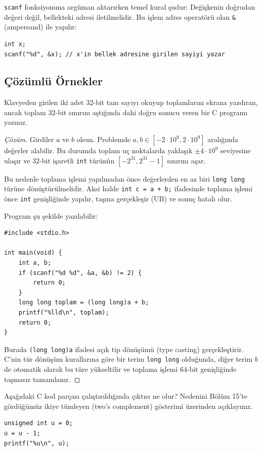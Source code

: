 \texttt{scanf} fonksiyonuna argüman aktarırken temel kural şudur: Değişkenin doğrudan değeri değil, bellekteki adresi iletilmelidir. Bu işlem adres operatörü olan \texttt{\&} (ampersand) ile yapılır:
\begin{lstlisting}[language=CTemel]
int x;
scanf("%d", &x); // x'in bellek adresine girilen sayiyi yazar
\end{lstlisting}

\subsection{Çözümlü Örnekler}

\begin{example}
Klavyeden girilen iki adet $32$-bit tam sayıyı okuyup toplamlarını ekrana yazdıran, ancak toplam $32$-bit sınırını aştığında dahi doğru sonucu veren bir C programı yazınız.
\end{example}

\begin{proof}[Çözüm]
Girdiler $a$ ve $b$ olsun. Problemde $a, b \in [-2\cdot 10^9, 2\cdot 10^9]$ aralığında değerler alabilir. Bu durumda toplam uç noktalarda yaklaşık $\pm 4\cdot 10^9$ seviyesine ulaşır ve $32$-bit işaretli \texttt{int} türünün $[-2^{31}, 2^{31}-1]$ sınırını aşar.

Bu nedenle toplama işlemi yapılmadan önce değerlerden en az biri \texttt{long long} türüne dönüştürülmelidir. Aksi halde \texttt{int c = a + b;} ifadesinde toplama işlemi önce \texttt{int} genişliğinde yapılır, taşma gerçekleşir (UB) ve sonuç hatalı olur.

Program şu şekilde yazılabilir:
\begin{lstlisting}[language=CTemel]
#include <stdio.h>

int main(void) {
    int a, b;
    if (scanf("%d %d", &a, &b) != 2) {
        return 0;
    }
    long long toplam = (long long)a + b;
    printf("%lld\n", toplam);
    return 0;
}
\end{lstlisting}
Burada \texttt{(long long)a} ifadesi açık tip dönüşümü (type casting) gerçekleştirir. C'nin tür dönüşüm kurallarına göre bir terim \texttt{long long} olduğunda, diğer terim $b$ de otomatik olarak bu türe yükseltilir ve toplama işlemi 64-bit genişliğinde taşmasız tamamlanır.
\end{proof}

\begin{example}
Aşağıdaki C kod parçası çalıştırıldığında çıktısı ne olur? Nedenini Bölüm 15'te gördüğümüz ikiye tümleyen (two's complement) gösterimi üzerinden açıklayınız.

\begin{lstlisting}[language=CTemel]
unsigned int u = 0;
u = u - 1;
printf("%u\n", u);
\end{lstlisting}
\end{example}

